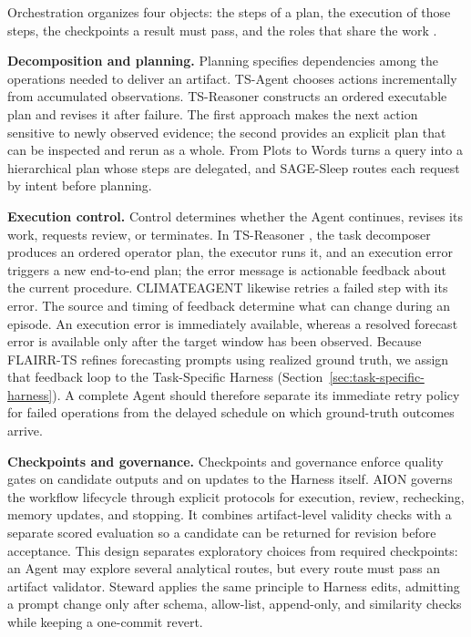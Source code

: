 \documentclass[preprints,article,submit,moreauthors]{Definitions/mdpi}
\begin{document}
Orchestration organizes four objects: the steps of a plan, the execution of those steps, the checkpoints a result must pass, and the roles that share the work \citep{ning2026codeharness}.

\noindent\textbf{Decomposition and planning.} Planning specifies dependencies among the operations needed to deliver an artifact. TS-Agent \citep{tsagent2025} chooses actions incrementally from accumulated observations. TS-Reasoner \citep{tsreasoner2026} constructs an ordered executable plan and revises it after failure. The first approach makes the next action sensitive to newly observed evidence; the second provides an explicit plan that can be inspected and rerun as a whole. From Plots to Words \citep{plotstowords2026} turns a query into a hierarchical plan whose steps are delegated, and SAGE-Sleep \citep{sagesleep2026} routes each request by intent before planning.

\noindent\textbf{Execution control.} Control determines whether the Agent continues, revises its work, requests review, or terminates. In TS-Reasoner \citep{tsreasoner2026}, the task decomposer produces an ordered operator plan, the executor runs it, and an execution error triggers a new end-to-end plan; the error message is actionable feedback about the current procedure. CLIMATEAGENT \citep{climateagent2025} likewise retries a failed step with its error. The source and timing of feedback determine what can change during an episode. An execution error is immediately available, whereas a resolved forecast error is available only after the target window has been observed. Because FLAIRR-TS \citep{flairr2025} refines forecasting prompts using realized ground truth, we assign that feedback loop to the Task-Specific Harness (Section~\ref{sec:task-specific-harness}). A complete Agent should therefore separate its immediate retry policy for failed operations from the delayed schedule on which ground-truth outcomes arrive.

\noindent\textbf{Checkpoints and governance.} Checkpoints and governance enforce quality gates on candidate outputs and on updates to the Harness itself. AION \citep{aion2026} governs the workflow lifecycle through explicit protocols for execution, review, rechecking, memory updates, and stopping. It combines artifact-level validity checks with a separate scored evaluation so a candidate can be returned for revision before acceptance. This design separates exploratory choices from required checkpoints: an Agent may explore several analytical routes, but every route must pass an artifact validator. Steward \citep{steward2026} applies the same principle to Harness edits, admitting a prompt change only after schema, allow-list, append-only, and similarity checks while keeping a one-commit revert.
\end{document}
